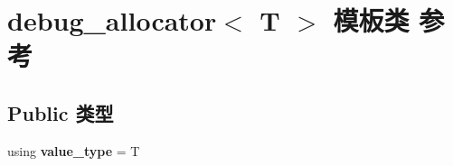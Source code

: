 \hypertarget{classdebug__allocator}{}\section{debug\+\_\+allocator$<$ T $>$ 模板类 参考}
\label{classdebug__allocator}
\subsection*{Public 类型}
\begin{DoxyCompactItemize}
\item 
\mbox{\label{classdebug__allocator_a3ba700c6efea5f5bafcafac396defd19}} 
using {\bfseries value\+\_\+type} = T
\end{DoxyCompactItemize}
